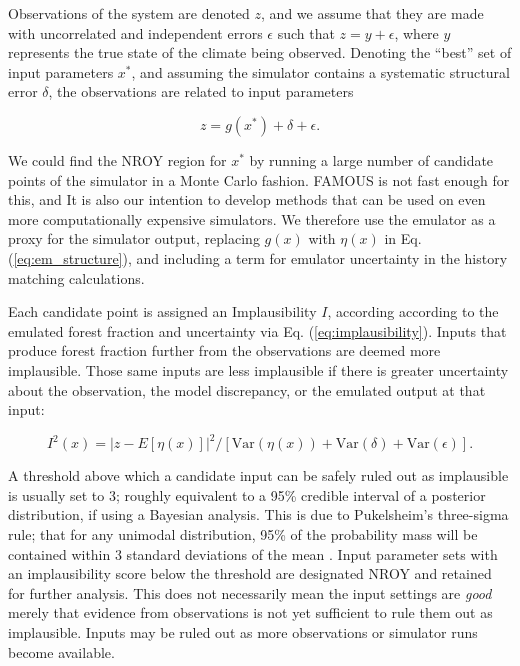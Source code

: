 \documentclass[esd, article]{copernicus} %
\begin{document}
Observations of the system are denoted $z$, and we assume that they are made with uncorrelated and independent errors $\epsilon$ such that $z=y+\epsilon$, where $y$ represents the true state of the climate being observed. Denoting the ``best'' set of input parameters $x^{*}$, and assuming the simulator contains a systematic structural error $\delta$, the observations are related to input parameters

\begin{equation}\label{eq:em_structure}
z=g(x^*) + \delta + \epsilon.
\end{equation}

We could find the NROY region for $x^{*}$ by running a large number of candidate points of the simulator in a Monte Carlo fashion. FAMOUS is not fast enough for this, and It is also our intention to develop methods that can be used on even more computationally expensive simulators. We therefore use the emulator as a proxy for the simulator output, replacing $g(x)$ with $\eta(x)$ in Eq. (\ref{eq:em_structure}), and including a term for emulator uncertainty in the history matching calculations.

Each candidate point is assigned an Implausibility $I$, according according to the emulated forest fraction and uncertainty via Eq. (\ref{eq:implausibility}). Inputs that produce forest fraction further from the observations are deemed more implausible. Those same inputs are less implausible if there is greater uncertainty about the observation, the model discrepancy, or the emulated output at that input:

\begin{equation}\label{eq:implausibility}
I^{2}(x)=  |z -E[\eta(x)]|^{2} / [\textrm{Var}(\eta(x)) +\textrm{Var}(\delta) +\textrm{Var}(\epsilon)].
\end{equation}

A threshold above which a candidate input can be safely ruled out as implausible is usually set to 3; roughly equivalent to a 95\% credible interval of a posterior distribution, if using a Bayesian analysis. This is due to Pukelsheim's three-sigma rule; that for any unimodal distribution, 95\% of the probability mass will be contained within 3 standard deviations of the mean \citep{pukelsheim1994three}. Input parameter sets with an implausibility score below the threshold are designated NROY and retained for further analysis. This does not necessarily mean the input settings are \emph{good} merely that evidence from observations is not yet sufficient to rule them out as implausible. Inputs may be ruled out as more observations or simulator runs become available.
\end{document}
